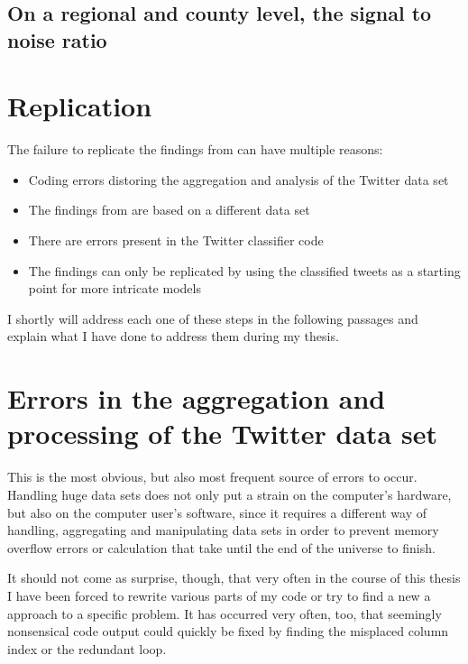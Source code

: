 \documentclass[11pt, a4paper,twoside]{report}\usepackage[]{graphicx}\usepackage[]{color}
\begin{document}
\subsection{On a regional and county level, the signal to noise ratio}

\section{Replication}
\label{sec:disc_replication}
The failure to replicate the findings from \citep{bodnar_data_2015} can have multiple reasons: 

\begin{itemize}
\item Coding errors distoring the aggregation and analysis of the Twitter data set
\item The findings from \citep{bodnar_data_2015} are based on a different data set
\item There are errors present in the Twitter classifier code
\item The findings can only be replicated by using the classified tweets as a starting point for more intricate models
\end{itemize}

I shortly will address each one of these steps in the following passages and explain what I have done to address them during my thesis. 

\section{Errors in the aggregation and processing of the Twitter data set}
This is the most obvious, but also most frequent source of errors to occur. Handling huge data sets does not only put a strain on the computer's hardware, but also on the computer user's software, since it requires a different way of handling, aggregating and manipulating data sets in order to prevent memory overflow errors or calculation that take until the end of the universe to finish.

It should not come as surprise, though, that very often in the course of this thesis I have been forced to rewrite various parts of my code or try to find a new a approach to a specific problem. It has occurred very often, too, that seemingly nonsensical code output could quickly be fixed by finding the misplaced column index or the redundant loop.
\end{document}
